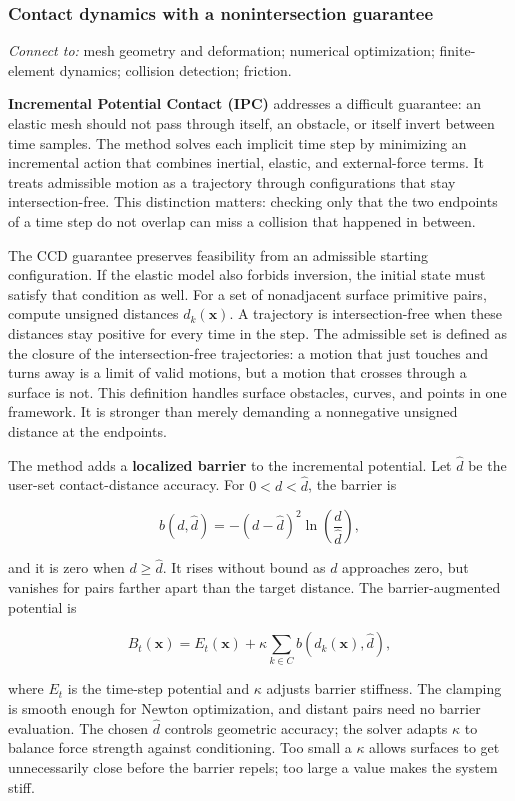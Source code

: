 \subsubsection{Contact dynamics with a nonintersection guarantee}\label{contact-dynamics-with-a-nonintersection-guarantee}

\emph{Connect to:} mesh geometry and deformation; numerical optimization; finite-element dynamics; collision detection; friction.

\textbf{Incremental Potential Contact (IPC)} addresses a difficult guarantee: an elastic mesh should not pass through itself, an obstacle, or itself invert between time samples. The method solves each implicit time step by minimizing an incremental action that combines inertial, elastic, and external-force terms. It treats admissible motion as a trajectory through configurations that stay intersection-free. This distinction matters: checking only that the two endpoints of a time step do not overlap can miss a collision that happened in between.

The CCD guarantee preserves feasibility from an admissible starting configuration. If the elastic model also forbids inversion, the initial state must satisfy that condition as well. For a set of nonadjacent surface primitive pairs, compute unsigned distances \(d_k(\mathbf{x})\). A trajectory is intersection-free when these distances stay positive for every time in the step. The admissible set is defined as the closure of the intersection-free trajectories: a motion that just touches and turns away is a limit of valid motions, but a motion that crosses through a surface is not. This definition handles surface obstacles, curves, and points in one framework. It is stronger than merely demanding a nonnegative unsigned distance at the endpoints.

The method adds a \textbf{localized barrier} to the incremental potential. Let \(\widehat d\) be the user-set contact-distance accuracy. For \(0<d<\widehat d\), the barrier is

\[b(d,\widehat d)=-(d-\widehat d)^2\ln\left(\frac{d}{\widehat d}\right),\]

and it is zero when \(d\ge\widehat d\). It rises without bound as \(d\) approaches zero, but vanishes for pairs farther apart than the target distance. The barrier-augmented potential is

\[B_t(\mathbf{x})=E_t(\mathbf{x})+\kappa\sum_{k\in C}b(d_k(\mathbf{x}),\widehat d),\]

where \(E_t\) is the time-step potential and \(\kappa\) adjusts barrier stiffness. The clamping is smooth enough for Newton optimization, and distant pairs need no barrier evaluation. The chosen \(\widehat d\) controls geometric accuracy; the solver adapts \(\kappa\) to balance force strength against conditioning. Too small a \(\kappa\) allows surfaces to get unnecessarily close before the barrier repels; too large a value makes the system stiff.

